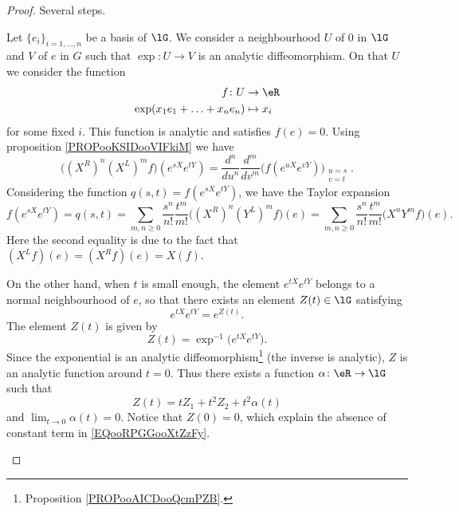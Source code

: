 \begin{proof}
    Several steps.
    \begin{subproof}
        
            Let \( \{ e_i \}_{i=1,\ldots, n}\) be a basis of \( \lG\). We consider a neighbourhood \( U\) of \( 0\) in \( \lG\) and \( V\) of \( e\) in \( G\) such that \( \exp\colon U\to V\) is an analytic diffeomorphism. On that \( U\) we consider the function
            \begin{equation}
                \begin{aligned}
                    f\colon U&\to \eR \\
                    \exp(x_1e_1+\ldots +x_ne_n)&\mapsto x_i 
                \end{aligned}
            \end{equation}
            for some fixed \( i\). This function is analytic and satisfies \( f(e)=0\). 
            Using proposition \ref{PROPooKSIDooVIFkiM} we have
            \begin{equation}
                \big( (X^R)^n(X^L)^mf \big)( e^{sX} e^{tY})=\frac{ d^n }{ du^n }\frac{ d^m }{ dv^m }\big( f( e^{uX} e^{vY}) \big)_{\substack{u=s\\v=t}}.
            \end{equation}
            Considering the function \( q(s,t)=f( e^{sX} e^{tY})\), we have the Taylor expansion
            \begin{equation}        \label{EQooNBOIooRxlZmP}
                f( e^{sX} e^{tY})=q(s,t)=\sum_{m,n\geq 0}\frac{ s^n }{ n! }\frac{ t^m }{ m! }\big( (X^R)^n(Y^L)^mf \big)(e)=\sum_{m,n\geq 0}\frac{ s^n }{ n! }\frac{ t^m }{ m! }\big( X^nY^mf \big)(e).
            \end{equation}
            Here the second equality is due to the fact that \( (X^Lf)(e)=(X^Rf)(e)=X(f)\).


            On the other hand, when \( t\) is small enough, the element \(  e^{tX} e^{tY}\) belongs to a normal neighbourhood of \( e\), so that there exists an element \( Z(t)\in \lG\) satisfying
            \begin{equation}
                e^{tX} e^{tY}= e^{Z(t)}.
            \end{equation}
            The element \( Z(t)\) is given by
            \begin{equation}
                Z(t)=\exp^{-1}\big(  e^{tX} e^{tY} \big).
            \end{equation}
            Since the exponential is an analytic diffeomorphism\footnote{Proposition \ref{PROPooAICDooQcmPZB}.} (the inverse is analytic), \( Z\) is an analytic function around \( t=0\). Thus there exists a function \( \alpha\colon \eR\to \lG\) such that
            \begin{equation}        \label{EQooRPGGooXtZzFy}
                Z(t)=tZ_1+t^2Z_2+t^2\alpha(t)
            \end{equation}
            and \( \lim_{t\to 0} \alpha(t)=0\). Notice that \( Z(0)=0\), which explain the absence of constant term in \eqref{EQooRPGGooXtZzFy}.


\end{subproof}
\end{proof}
